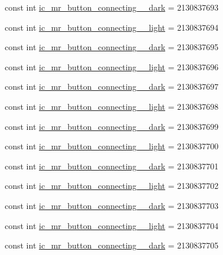 \begin{CompactItemize}
\item 
const int \hyperlink{class__2doo_1_1_droid_1_1_resource_1_1_drawable_6d776e2f14796405de548ff9d848da49}{ic\_\-mr\_\-button\_\-connecting\_\_\-dark} = 2130837693
\item 
const int \hyperlink{class__2doo_1_1_droid_1_1_resource_1_1_drawable_a6ee8ef9cf077270f336195ae1e620f8}{ic\_\-mr\_\-button\_\-connecting\_\_\-light} = 2130837694
\item 
const int \hyperlink{class__2doo_1_1_droid_1_1_resource_1_1_drawable_6c8acdae392e8a16e26799d36b981591}{ic\_\-mr\_\-button\_\-connecting\_\_\-dark} = 2130837695
\item 
const int \hyperlink{class__2doo_1_1_droid_1_1_resource_1_1_drawable_f11f3302c76ffb1287a20050f6c991c9}{ic\_\-mr\_\-button\_\-connecting\_\_\-light} = 2130837696
\item 
const int \hyperlink{class__2doo_1_1_droid_1_1_resource_1_1_drawable_7a0a971fc63de1fc62e4006b5908b2e6}{ic\_\-mr\_\-button\_\-connecting\_\_\-dark} = 2130837697
\item 
const int \hyperlink{class__2doo_1_1_droid_1_1_resource_1_1_drawable_b4d6b901005cf105e42a53e285b46713}{ic\_\-mr\_\-button\_\-connecting\_\_\-light} = 2130837698
\item 
const int \hyperlink{class__2doo_1_1_droid_1_1_resource_1_1_drawable_40013514339f3bce2568f334d6d7d6bf}{ic\_\-mr\_\-button\_\-connecting\_\_\-dark} = 2130837699
\item 
const int \hyperlink{class__2doo_1_1_droid_1_1_resource_1_1_drawable_bfbe8a797a2dcb38f31c37486bd5fc77}{ic\_\-mr\_\-button\_\-connecting\_\_\-light} = 2130837700
\item 
const int \hyperlink{class__2doo_1_1_droid_1_1_resource_1_1_drawable_940c2b17c58e67e0753feba0e05a7838}{ic\_\-mr\_\-button\_\-connecting\_\_\-dark} = 2130837701
\item 
const int \hyperlink{class__2doo_1_1_droid_1_1_resource_1_1_drawable_29ec8edf373ed609a74b035022806806}{ic\_\-mr\_\-button\_\-connecting\_\_\-light} = 2130837702
\item 
const int \hyperlink{class__2doo_1_1_droid_1_1_resource_1_1_drawable_ac32a5a5d9671fa7d30898f05ddd674e}{ic\_\-mr\_\-button\_\-connecting\_\_\-dark} = 2130837703
\item 
const int \hyperlink{class__2doo_1_1_droid_1_1_resource_1_1_drawable_eaeb6b74fad59658ece81135a87252a6}{ic\_\-mr\_\-button\_\-connecting\_\_\-light} = 2130837704
\item 
const int \hyperlink{class__2doo_1_1_droid_1_1_resource_1_1_drawable_f1384c11838259e17a3058aa0ae641b4}{ic\_\-mr\_\-button\_\-connecting\_\_\-dark} = 2130837705

\end{CompactItemize}
